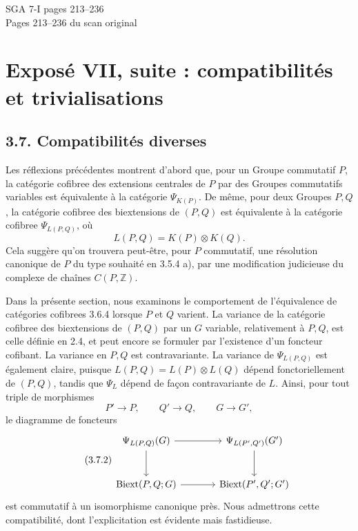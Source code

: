 \documentclass[11pt]{article}
\providecommand{\Biext}{\operatorname{Biext}}
\begin{document}
\begin{center}
{\Large SGA 7-I pages 213--236}\\[0.35em]
{\large Pages 213--236 du scan original}
\end{center}


\section*{Exposé VII, suite : compatibilités et trivialisations}

\subsection*{3.7. Compatibilités diverses}

Les réflexions précédentes montrent d'abord que, pour un Groupe commutatif \(P\), la catégorie cofibree des extensions centrales de \(P\) par des Groupes commutatifs variables est équivalente à la catégorie \(\Psi_{K(P)}\).  De même, pour deux Groupes \(P,Q\), la catégorie cofibree des biextensions de \((P,Q)\) est équivalente à la catégorie cofibree \(\Psi_{L(P,Q)}\), où
\[
        L(P,Q)=K(P)\otimes K(Q).
\]
Cela suggère qu'on trouvera peut-être, pour \(P\) commutatif, une résolution canonique de \(P\) du type souhaité en 3.5.4 a), par une modification judicieuse du complexe de chaînes \(C(P,\mathbb Z)\).

Dans la présente section, nous examinons le comportement de l'équivalence de catégories cofibrees 3.6.4 lorsque \(P\) et \(Q\) varient.  La variance de la catégorie cofibree des biextensions de \((P,Q)\) par un \(G\) variable, relativement à \(P,Q\), est celle définie en 2.4, et peut encore se formuler par l'existence d'un foncteur cofibant.  La variance en \(P,Q\) est contravariante.  La variance de \(\Psi_{L(P,Q)}\) est également claire, puisque \(L(P,Q)=L(P)\otimes L(Q)\) dépend fonctoriellement de \((P,Q)\), tandis que \(\Psi_L\) dépend de façon contravariante de \(L\).  Ainsi, pour tout triple de morphismes
\begin{equation}\tag{3.7.1}
        P'\to P,
        \qquad Q'\to Q,
        \qquad G\to G',
\end{equation}
le diagramme de foncteurs
\begin{equation}\tag{3.7.2}
\begin{tikzcd}[column sep=large,row sep=large]
 \Psi_{L(P,Q)}(G) \arrow[r] \arrow[d] & \Psi_{L(P',Q')}(G') \arrow[d] \\
 \Biext(P,Q;G) \arrow[r] & \Biext(P',Q';G')
\end{tikzcd}
\end{equation}
est commutatif à un isomorphisme canonique près.  Nous admettrons cette compatibilité, dont l'explicitation est évidente mais fastidieuse.
\end{document}
